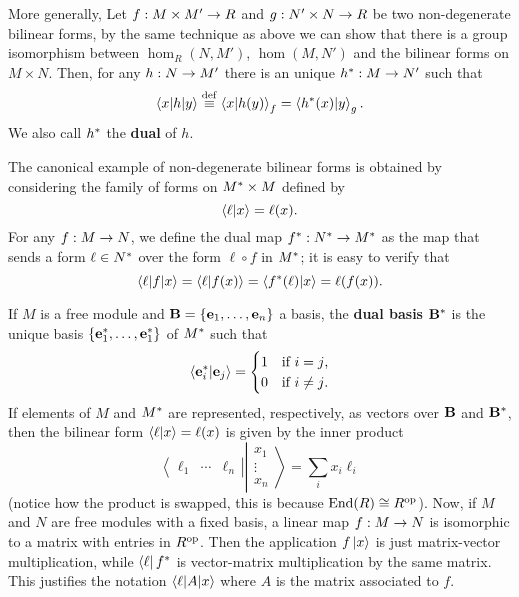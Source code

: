 More generally, Let $f:M\times M'\rightarrow R$ and $g:N'\times N\rightarrow R$ be two
non-degenerate bilinear forms, by the same technique as above we can
show that there is a group isomorphism between $\hom_R(N,M')$,
$\hom(M,N')$ and the bilinear forms on $M\times N$. Then, for any
$h:N\rightarrow M'$ there is an unique $h^\ast:M\rightarrow N'$ such that
\[\left\langle x \middle| h \middle| y \right\rangle\overset{\mathrm{def}}{\equiv}\left\langle x \middle| h(y) \right\rangle_f = \left\langle h^\ast(x) \middle| y \right\rangle_g 
\text{.}\]
We also call $h^\ast$ the \textbf{dual} of $h$.

The canonical example of non-degenerate bilinear forms is obtained by
considering the family of forms on $M^\ast\times M$ defined by
\[\left\langle \ell \middle| x \right\rangle = \ell(x) \text{.}\]
For any $f:M\rightarrow N$, we define the dual map
$f^\ast:N^\ast\rightarrow M^\ast$ as the map that sends a form
$\ell\in N^\ast$ over the form $\ell\circ f$ in $M^\ast$; it is
easy to verify that
\[\left\langle \ell \middle| f \middle| x \right\rangle =  \left\langle \ell \middle| f(x) \right\rangle = \left\langle f^\ast(\ell) \middle| x \right\rangle
= \ell(f(x))\text{.}\]


  If $M$ is a free module and
$\mathbf{B}=\{\mathbf{e}_1,\ldots,\mathbf{e}_n\}$ a basis, the
\textbf{dual basis} $\mathbf{B}^\ast$ is the unique
basis $\{\mathbf{e}_1^\ast,\ldots,\mathbf{e}_1^\ast\}$ of $M^\ast$
such that
\begin{equation*}
  \left\langle \mathbf{e}_i^\ast \middle| \mathbf{e}_j \right\rangle =
  \begin{cases}
    1 &\text{if $i=j$,}\\
    0 &\text{if $i\ne j$.}
  \end{cases}
\end{equation*}
If elements of $M$ and $M^\ast$ are represented, respectively, as
vectors over $\mathbf{B}$ and $\mathbf{B}^\ast$, then the bilinear
form $\left\langle \ell \middle| x \right\rangle=\ell(x)$ is given by the inner product
\begin{equation*}
  \left\langle\begin{matrix}
      \ell_1 &\cdots & \ell_n
    \end{matrix}\right\rvert
  \left\lvert\begin{matrix}
    x_1\\
    \vdots\\
    x_n
  \end{matrix}\right\rangle
  =
  \sum_i x_i\ell_i
\end{equation*}
(notice how the product is swapped, this is because $\operatorname{End}(R)\cong
R^{\mathrm{op}}$).  Now, if $M$ and $N$ are free modules with a fixed basis, a
linear map $f:M\rightarrow N$ is isomorphic to a matrix with entries in
$R^{\mathrm{op}}$. Then the application $f\left\lvert x \right\rangle$ is just matrix-vector
multiplication, while $\left\langle \ell \right\rvert f^\ast$ is vector-matrix
multiplication by the same matrix. This justifies the notation
$\left\langle \ell \middle| A \middle| x \right\rangle$ where $A$ is the matrix associated to $f$.


